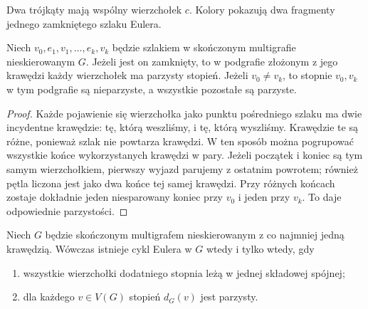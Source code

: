 \begin{center}

{\footnotesize Dwa trójkąty mają wspólny wierzchołek $c$.
Kolory pokazują dwa fragmenty jednego zamkniętego szlaku Eulera.}
\end{center}

\begin{lemat}
\label{lem:tg-euler-parity}
Niech $v_0,e_1,v_1,\dots,e_k,v_k$ będzie szlakiem
w skończonym multigrafie nieskierowanym $G$. Jeżeli jest on
zamknięty, to w podgrafie złożonym z jego krawędzi każdy
wierzchołek ma parzysty stopień. Jeżeli $v_0\ne v_k$,
to stopnie $v_0,v_k$ w tym podgrafie są nieparzyste,
a wszystkie pozostałe są parzyste.
\end{lemat}

\begin{proof}
Każde pojawienie się wierzchołka jako punktu pośredniego
szlaku ma dwie incydentne krawędzie: tę, którą weszliśmy,
i tę, którą wyszliśmy. Krawędzie te są różne, ponieważ szlak
nie powtarza krawędzi. W ten sposób można pogrupować
wszystkie końce wykorzystanych krawędzi w pary.
Jeżeli początek i koniec są tym samym wierzchołkiem,
pierwszy wyjazd parujemy z ostatnim powrotem; również pętla
liczona jest jako dwa końce tej samej krawędzi. Przy różnych
końcach zostaje dokładnie jeden niesparowany koniec
przy $v_0$ i jeden przy $v_k$. To daje odpowiednie parzystości.
\end{proof}

\begin{twierdzenie}
\label{thm:tg-euler-circuit}
Niech $G$ będzie skończonym multigrafem nieskierowanym
z co najmniej jedną krawędzią. Wówczas istnieje cykl Eulera
w $G$ wtedy i tylko wtedy, gdy
\begin{enumerate}[label=(\roman*)]
\item wszystkie wierzchołki dodatniego stopnia leżą w jednej
składowej spójnej;
\item dla każdego $v\in V(G)$ stopień $d_G(v)$ jest parzysty.
\end{enumerate}
\end{twierdzenie}

